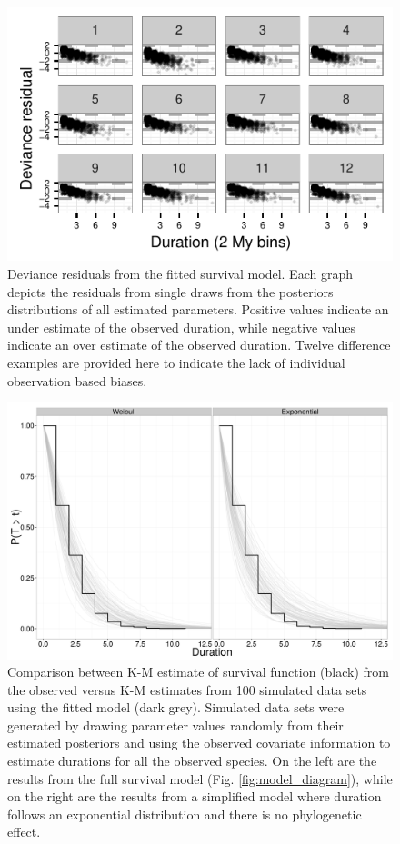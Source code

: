 \documentclass[12pt,letterpaper]{article}
\begin{document}
\begin{figure}[ht]
  \centering
  \includegraphics[height = 0.5\textheight, width = \textwidth, keepaspectratio = true]{figure/residual_plot}
  \caption{Deviance residuals from the fitted survival model. Each graph depicts the residuals from single draws from the posteriors distributions of all estimated parameters. Positive values indicate an under estimate of the observed duration, while negative values indicate an over estimate of the observed duration. Twelve difference examples are provided here to indicate the lack of individual observation based biases.}
  \label{fig:ppc_res}
\end{figure}

\begin{figure}[ht]
  \centering
  \includegraphics[height = 0.5\textheight, width = \textwidth, keepaspectratio = true]{figure/survival_function}
  \caption{Comparison between K-M estimate of survival function (black) from the observed versus K-M estimates from 100 simulated data sets using the fitted model (dark grey). Simulated data sets were generated by drawing parameter values randomly from their estimated posteriors and using the observed covariate information to estimate durations for all the observed species. On the left are the results from the full survival model (Fig. \ref{fig:model_diagram}), while on the right are the results from a simplified model where duration follows an exponential distribution and there is no phylogenetic effect.}
  \label{fig:ppc_surv}
\end{figure}
\end{document}

